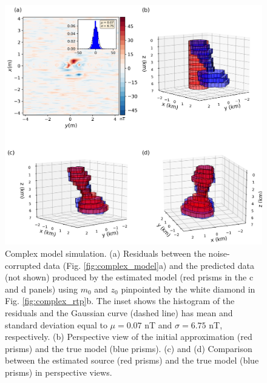 \begin{figure}
    \centering
    \includegraphics[width=\linewidth]{figures/complex_results.png}
    \caption{Complex model simulation. (a) Residuals between the noise-corrupted data (Fig. \ref{fig:complex_model}a) and the predicted data (not shown) produced by the estimated model (red prisms in the c and d panels) using $m_0$  and $z_0$ pinpointed by the white diamond in Fig. \ref{fig:complex_rtp}b.
    The inset shows the histogram of the residuals and the Gaussian curve (dashed line) has mean and standard deviation equal to $\mu = 0.07$ nT and $\sigma=6.75$ nT, respectively.  (b) Perspective view of the initial approximation (red prisms) and the true model (blue prisms). (c) and (d) Comparison between the estimated source (red prisms) and the true model (blue prisms) in perspective views. 
}
    \label{fig:complex_result}
\end{figure}


